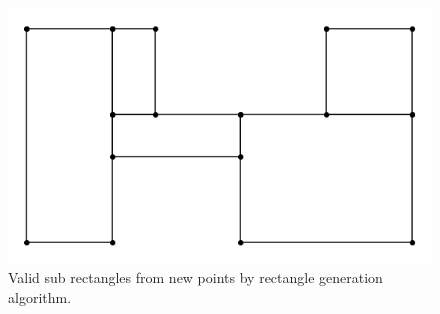\documentclass[a4paper,17pt]{article}
\begin{document}
\begin{figure}[h]
\centering
\includegraphics[width=1\textwidth]{final-output.png}
\caption{Valid  sub rectangles from new points by rectangle generation algorithm.}
\label{fig:FO}
\end{figure}



% 


\end{document}
